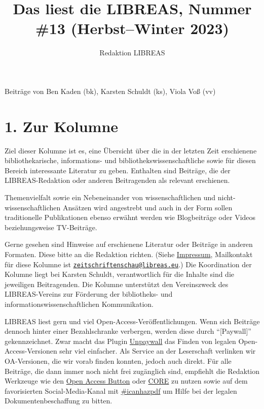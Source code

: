 \documentclass[a4paper,
fontsize=11pt,
oneside,
numbers=noperiodatend,
parskip=half-,
bibliography=totoc,
final
]{scrartcl}
\title{\LARGE{Das liest die LIBREAS, Nummer \#13 (Herbst–Winter 2023)}}%
\author{Redaktion LIBREAS} %
\date{}
\begin{document}
\maketitle
\thispagestyle{fancyplain} 


Beiträge von Ben Kaden (bk), Karsten Schuldt (ks), Viola Voß (vv)

\hypertarget{zur-kolumne}{%
\section{1. Zur Kolumne}\label{zur-kolumne}}

Ziel dieser Kolumne ist es, eine Übersicht über die in der letzten Zeit
erschienene bibliothekarische, informations- und
bibliothekswissenschaftliche sowie für diesen Bereich interessante
Literatur zu geben. Enthalten sind Beiträge, die der LIBREAS-Redaktion
oder anderen Beitragenden als relevant erschienen.

Themenvielfalt sowie ein Nebeneinander von wissenschaftlichen und
nicht-wissenschaftlichen Ansätzen wird angestrebt und auch in der Form
sollen traditionelle Publikationen ebenso erwähnt werden wie
Blogbeiträge oder Videos beziehungsweise TV-Beiträge.

Gerne gesehen sind Hinweise auf erschienene Literatur oder Beiträge in
anderen Formaten. Diese bitte an die Redaktion richten. (Siehe
\href{http://libreas.eu/about/}{Impressum}, Mailkontakt für diese
Kolumne ist
\href{mailto:zeitschriftenschau@libreas.eu}{\nolinkurl{zeitschriftenschau@libreas.eu}}.)
Die Koordination der Kolumne liegt bei Karsten Schuldt, verantwortlich
für die Inhalte sind die jeweiligen Beitragenden. Die Kolumne
unterstützt den Vereinszweck des LIBREAS-Vereins zur Förderung der
bibliotheks- und informationswissenschaftlichen Kommunikation.

LIBREAS liest gern und viel Open-Access-Veröffentlichungen. Wenn sich
Beiträge dennoch hinter einer Bezahlschranke verbergen, werden diese
durch \enquote{{[}Paywall{]}} gekennzeichnet. Zwar macht das Plugin
\href{http://unpaywall.org/}{Unpaywall} das Finden von legalen
Open-Access-Versionen sehr viel einfacher. Als Service an der
Leserschaft verlinken wir OA-Versionen, die wir vorab finden konnten,
jedoch auch direkt. Für alle Beiträge, die dann immer noch nicht frei
zugänglich sind, empfiehlt die Redaktion Werkzeuge wie den
\href{https://openaccessbutton.org/}{Open Access Button} oder
\href{https://core.ac.uk/services/discovery/}{CORE} zu nutzen sowie auf dem favorisierten Social-Media-Kanal mit
\href{https://mastodon.social/tags/icanhazpdf}{\#icanhazpdf} um
Hilfe bei der legalen Dokumentenbeschaffung zu bitten.
\end{document}
